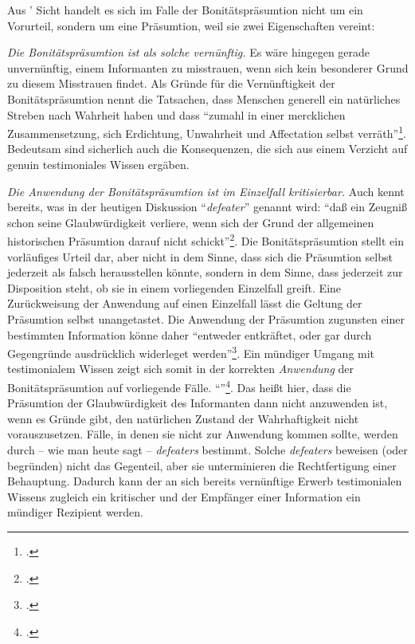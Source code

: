 Aus ' Sicht handelt es sich
im Falle der Bonitätspräsumtion nicht um ein Vorurteil, sondern um eine Präsumtion,
weil sie zwei Eigenschaften vereint:
\begin{nummerierung}
\item \emph{Die Bonitätspräsumtion ist als solche vernünftig.} Es wäre hingegen
gerade unvernünftig, einem Informanten zu misstrauen, wenn sich kein besonderer
Grund zu diesem Misstrauen findet. Als Gründe für die Vernünftigkeit der
Bonitätspräsumtion nennt 
die Tatsachen, dass Menschen generell ein natürliches Streben nach Wahrheit
haben und dass \enquote{zumahl in einer mercklichen Zusammensetzung, sich
Erdichtung, Unwahrheit und Affectation selbst verräth}\footnote{\cite[][\S~606]{Crusius:WegzurGewissheitundZuverlaessigkeitdermenschlichenErkenntniss1965}.}.
Bedeutsam sind sicherlich auch die Konsequenzen, die sich aus einem Verzicht auf
genuin testimoniales Wissen ergäben.

\item \emph{Die Anwendung der Bonitätspräsumtion ist im Einzelfall
kritisierbar.} Auch  kennt
bereits, was in der heutigen Diskussion \enquote{\emph{defeater}} genannt wird:
\enquote{daß ein Zeugniß schon seine Glaubwürdigkeit verliere, wenn sich der
Grund der allgemeinen historischen Präsumtion darauf nicht
schickt}\footnote{\Cite[][\S~617]{Crusius:WegzurGewissheitundZuverlaessigkeitdermenschlichenErkenntniss1965}.}.
Die Bonitätspräsumtion stellt ein vorläufiges Urteil dar, aber nicht in dem
Sinne, dass sich die Präsumtion selbst jederzeit als falsch herausstellen
könnte, sondern in dem Sinne, dass jederzeit zur Disposition steht, ob sie in
einem vorliegenden Einzelfall greift. Eine Zurückweisung der Anwendung auf einen
Einzelfall lässt die Geltung der Präsumtion selbst unangetastet. Die Anwendung
der Präsumtion zugunsten einer bestimmten Information könne daher
\enquote{entweder entkräftet, oder gar durch Gegengründe ausdrücklich widerleget
werden}\footnote{\Cite[][\S~606]{Crusius:WegzurGewissheitundZuverlaessigkeitdermenschlichenErkenntniss1965}.}.
Ein mündiger Umgang mit testimonialem Wissen zeigt sich somit in der korrekten
\emph{Anwendung} der Bonitätspräsumtion auf vorliegende Fälle.
\enquote{}\footnote{\Cite[][\S~407]{Crusius:WegzurGewissheitundZuverlaessigkeitdermenschlichenErkenntniss1965}.}.
Das heißt hier, dass die Präsumtion der Glaubwürdigkeit des Informanten dann
nicht anzuwenden ist, wenn es Gründe gibt, den natürlichen Zustand der
Wahrhaftigkeit nicht vorauszusetzen. Fälle, in denen sie nicht zur Anwendung
kommen sollte, werden durch -- wie man heute sagt -- \emph{defeaters} bestimmt.
Solche \emph{defeaters} beweisen (oder begründen) nicht das Gegenteil, aber sie
unterminieren die Rechtfertigung einer Behauptung. Dadurch kann der an sich
bereits vernünftige Erwerb testimonialen Wissens zugleich ein kritischer und der
Empfänger einer Information ein mündiger Rezipient werden.
\end{nummerierung}


